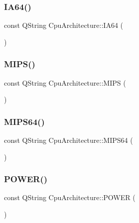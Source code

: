 \subsubsection{\texorpdfstring{I\+A64()}{IA64()}}
{\footnotesize\ttfamily const Q\+String Cpu\+Architecture\+::\+I\+A64 (\begin{DoxyParamCaption}\item[{\char`\"{}ia64\char`\"{}}]{ }\end{DoxyParamCaption})}

\mbox{\label{namespace_cpu_architecture_abdf3d30e94e980c990fa02fb6c8d73d1}} 
\subsubsection{\texorpdfstring{M\+I\+P\+S()}{MIPS()}}
{\footnotesize\ttfamily const Q\+String Cpu\+Architecture\+::\+M\+I\+PS (\begin{DoxyParamCaption}\item[{\char`\"{}mips\char`\"{}}]{ }\end{DoxyParamCaption})}

\mbox{\label{namespace_cpu_architecture_a23113174d9398d5ee88cc417b9e37eec}} 
\subsubsection{\texorpdfstring{M\+I\+P\+S64()}{MIPS64()}}
{\footnotesize\ttfamily const Q\+String Cpu\+Architecture\+::\+M\+I\+P\+S64 (\begin{DoxyParamCaption}\item[{\char`\"{}mips64\char`\"{}}]{ }\end{DoxyParamCaption})}

\mbox{\label{namespace_cpu_architecture_af08284c5cac96a2fbdb8f3808f54baf0}} 
\subsubsection{\texorpdfstring{P\+O\+W\+E\+R()}{POWER()}}
{\footnotesize\ttfamily const Q\+String Cpu\+Architecture\+::\+P\+O\+W\+ER (\begin{DoxyParamCaption}\item[{\char`\"{}power\char`\"{}}]{ }\end{DoxyParamCaption})}

